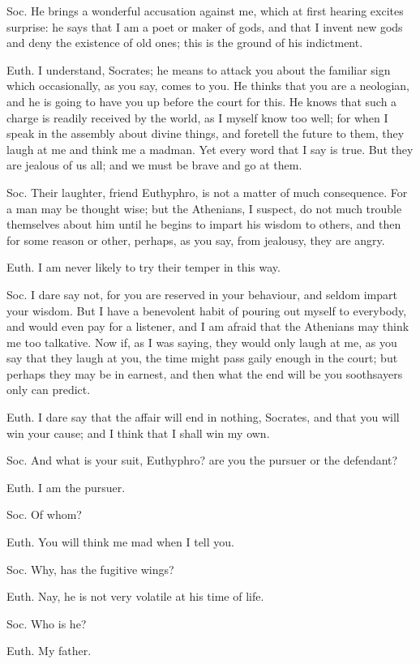 Soc. He brings a wonderful accusation against me, which at first hearing excites surprise: he says that I am a poet or maker of gods, and that I invent new gods and deny the existence of old ones; this is the ground of his indictment.

Euth. I understand, Socrates; he means to attack you about the familiar sign which occasionally, as you say, comes to you. He thinks that you are a neologian, and he is going to have you up before the court for this. He knows that such a charge is readily received by the world, as I myself know too well; for when I speak in the assembly about divine things, and foretell the future to them, they laugh at me and think me a madman. Yet every word that I say is true. But they are jealous of us all; and we must be brave and go at them.

Soc. Their laughter, friend Euthyphro, is not a matter of much consequence. For a man may be thought wise; but the Athenians, I suspect, do not much trouble themselves about him until he begins to impart his wisdom to others, and then for some reason or other, perhaps, as you say, from jealousy, they are angry.

Euth. I am never likely to try their temper in this way.

Soc. I dare say not, for you are reserved in your behaviour, and seldom impart your wisdom. But I have a benevolent habit of pouring out myself to everybody, and would even pay for a listener, and I am afraid that the Athenians may think me too talkative. Now if, as I was saying, they would only laugh at me, as you say that they laugh at you, the time might pass gaily enough in the court; but perhaps they may be in earnest, and then what the end will be you soothsayers only can predict.

Euth. I dare say that the affair will end in nothing, Socrates, and that you will win your cause; and I think that I shall win my own.

Soc. And what is your suit, Euthyphro? are you the pursuer or the defendant?

Euth. I am the pursuer.

Soc. Of whom?

Euth. You will think me mad when I tell you.

Soc. Why, has the fugitive wings?

Euth. Nay, he is not very volatile at his time of life.

Soc. Who is he?

Euth. My father.

